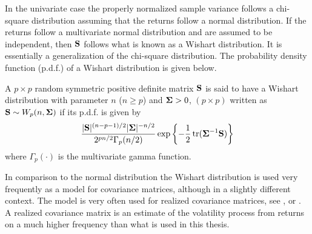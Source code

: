 \documentclass[12pt, twoside]{book}\usepackage{knitr}
\begin{document}
In the univariate case the properly normalized sample variance follows a chi-square distribution assuming that the returns follow a normal distribution. 
If the returns follow a multivariate normal distribution and are assumed to be independent, then $\mathbf{S}$ follows what is known as a Wishart distribution. 
It is essentially a generalization of the chi-square distribution. 
The probability density function (p.d.f.) of a Wishart distribution is given below.
\newpage %
\begin{definition}\label{def:wishart}
	A $p\times p$ random symmetric positive definite matrix $\mathbf{S}$ is said to have a Wishart distribution with parameter $n$ ($n\geq p$) and $\mathbf{\Sigma} > 0$, $(p \times p)$ written as $\mathbf{S} \sim W_p(n, \mathbf{\Sigma})$ if its p.d.f. is given by
	\begin{equation}\label{eqn:wishart_density}
  	\frac{|\mathbf{S}|^{(n-p-1)/2} |\mathbf{\Sigma}|^{- n/2} }{2^{pn/2} \Gamma_p (n/2) } \exp\left\{-\frac{1}{2} \operatorname{tr}(\mathbf{\Sigma}^{-1}\mathbf{S})  \right\}
	\end{equation}
	where $ \Gamma_p (\cdot) $ is the multivariate gamma function.
\end{definition}
In comparison to the normal distribution the Wishart distribution is used very frequently as a model for covariance matrices, although in a slightly different context.
The model is very often used for realized covariance matrices, see \citet{barndorff2004econometric}, \citet{golosnoy2019exponential} or \citet{alfelt2021modeling}.
A realized covariance matrix is an estimate of the volatility process from returns on a much higher frequency than what is used in this thesis.
\end{document}
